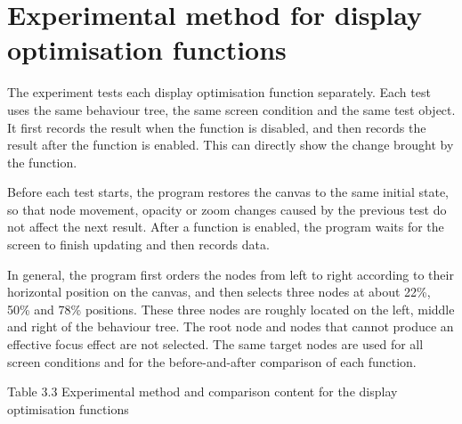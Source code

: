 \documentclass[11pt,a4paper,oneside,extrafontsizes]{memoir}
\begin{document}
\section{Experimental method for display optimisation functions}

The experiment tests each display optimisation function separately. Each test uses the same behaviour tree, the same screen condition and the same test object. It first records the result when the function is disabled, and then records the result after the function is enabled. This can directly show the change brought by the function.

Before each test starts, the program restores the canvas to the same initial state, so that node movement, opacity or zoom changes caused by the previous test do not affect the next result. After a function is enabled, the program waits for the screen to finish updating and then records data.

In general, the program first orders the nodes from left to right according to their horizontal position on the canvas, and then selects three nodes at about 22\%, 50\% and 78\% positions. These three nodes are roughly located on the left, middle and right of the behaviour tree. The root node and nodes that cannot produce an effective focus effect are not selected. The same target nodes are used for all screen conditions and for the before-and-after comparison of each function.

Table 3.3 Experimental method and comparison content for the display optimisation functions
\end{document}

